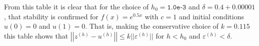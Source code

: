 From this table it is clear that for the choice of $h_0 = \texttt{1.0e-3}$ and $\delta = 0.4 + 0.00001$,
that stability is confirmed for $f(x) = e^{0.5x}$ with $c=1$ and initial conditions
$u(0) = 0$ and $u(1) = 0$. That is, making the conservative choice of $k = 0.115$
this table shows that $\left|\left|z^{(h)} - u^{(h)}\right|\right| \leq k ||\varepsilon ^{(h)}||$ for
$h < h_0$ and $\varepsilon^{(h)} < \delta$.
